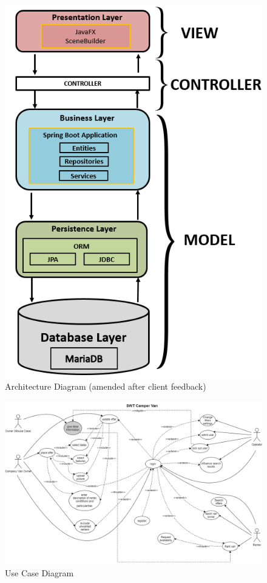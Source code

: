\begin{figure}[h]
	\centering
	\includegraphics[width=15cm]{resources/images/architecture_early_draft.png}
	\caption{Architecture Diagram (amended after client feedback)}
	\label{fig:architecture_early_draft}
\end{figure}

\begin{figure}[h]
	\centering
	\includegraphics[width=15cm]{resources/images/use-case-diagram.png}
	\caption{Use Case Diagram}
	\label{fig:use-case-diagram}
\end{figure}

